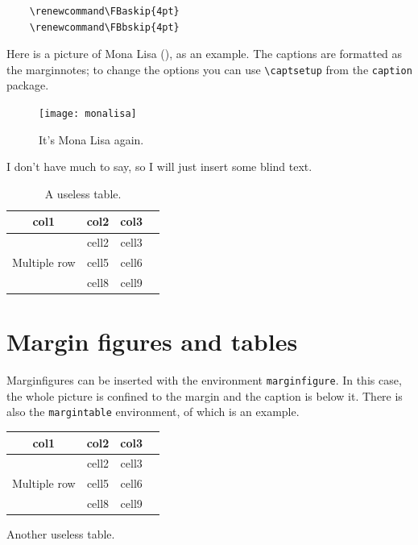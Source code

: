 \begin{verbatim}
	\renewcommand\FBaskip{4pt}
	\renewcommand\FBbskip{4pt}
\end{verbatim}

Here is a picture of Mona Lisa (), as an example. 
The captions are formatted as the marginnotes; to change the options you 
can use \verb|\captsetup| from the \verb|caption| package.

\begin{figure}[h]
	\texttt{[image: monalisa]}
	\caption[Mona Lisa, again]{It's Mona Lisa again. \blindtext}
\end{figure}

I don't have much to say, so I will just insert some blind text. 
\blindtext

\begin{table}
\begin{tabular}{ |c|c|c|c| } 
\hline
col1 & col2 & col3 \\
\hline
\multirow{3}{4em}{Multiple row} & cell2 & cell3 \\ 
& cell5 & cell6 \\ 
& cell8 & cell9 \\ 
\hline
\end{tabular}
\caption[A useless table]{A useless table.}
\end{table}

\blindtext

\section{Margin figures and tables}

Marginfigures can be inserted with the environment \verb|marginfigure|. 
In this case, the whole picture is confined to the margin and the 
caption is below it. There is also the \verb|margintable| environment, 
of which  is an example.

\begin{margintable}
\begin{tabular}{ |c|c|c|c| } 
\hline
col1 & col2 & col3 \\
\hline
\multirow{3}{4em}{Multiple row} & cell2 & cell3 \\ 
& cell5 & cell6 \\ 
& cell8 & cell9 \\ 
\hline
\end{tabular}
\caption[Another useless table]{Another useless table.}
\end{margintable}

